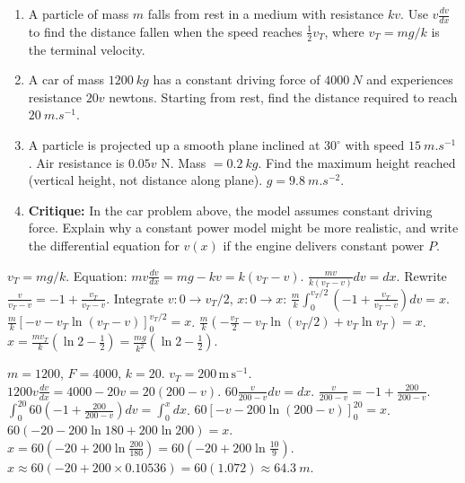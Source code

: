 \documentclass[11pt]{article}
\begin{document}
\begin{exercice}
\begin{enumerate}
\item A particle of mass $m$ falls from rest in a medium with resistance $kv$. Use $v\frac{dv}{dx}$ to find the distance fallen when the speed reaches $\frac{1}{2}v_T$, where $v_T=mg/k$ is the terminal velocity.
\item A car of mass $\SI{1200}{kg}$ has a constant driving force of $\SI{4000}{N}$ and experiences resistance $20v$ newtons. Starting from rest, find the distance required to reach $\SI{20}{m.s^{-1}}$.
\item A particle is projected up a smooth plane inclined at $30^\circ$ with speed $\SI{15}{m.s^{-1}}$. Air resistance is $0.05v$ N. Mass $=\SI{0.2}{kg}$. Find the maximum height reached (vertical height, not distance along plane). $g=\SI{9.8}{m.s^{-2}}$.
\item \textbf{Critique:} In the car problem above, the model assumes constant driving force. Explain why a constant power model might be more realistic, and write the differential equation for $v(x)$ if the engine delivers constant power $P$.
\end{enumerate}
\end{exercice}

\begin{corrige}[Exercise 1]
$v_T = mg/k$. Equation: $mv\frac{dv}{dx} = mg - kv = k(v_T - v)$.
$\frac{mv}{k(v_T-v)}dv = dx$. Rewrite $\frac{v}{v_T-v} = -1 + \frac{v_T}{v_T-v}$.
Integrate $v:0\to v_T/2$, $x:0\to x$:
$\frac{m}{k}\int_0^{v_T/2}(-1 + \frac{v_T}{v_T-v})dv = x$.
$\frac{m}{k}\left[ -v - v_T\ln(v_T-v) \right]_0^{v_T/2} = x$.
$\frac{m}{k}\left( -\frac{v_T}{2} - v_T\ln(v_T/2) + v_T\ln v_T \right) = x$.
$x = \frac{mv_T}{k}\left( \ln 2 - \frac{1}{2} \right) = \frac{mg}{k^2}\left( \ln 2 - \frac{1}{2} \right)$.
\end{corrige}

\begin{corrige}[Exercise 2]
$m=1200$, $F=4000$, $k=20$. $v_T = 200\,\mathrm{m\,s^{-1}}$.
$1200v\frac{dv}{dx} = 4000 - 20v = 20(200-v)$.
$60\frac{v}{200-v}dv = dx$. $\frac{v}{200-v} = -1 + \frac{200}{200-v}$.
$\int_0^{20} 60(-1 + \frac{200}{200-v})dv = \int_0^x dx$.
$60\left[ -v - 200\ln(200-v) \right]_0^{20} = x$.
$60\left( -20 - 200\ln180 + 200\ln200 \right) = x$.
$x = 60\left( -20 + 200\ln\frac{200}{180} \right) = 60\left( -20 + 200\ln\frac{10}{9} \right)$.
$x \approx 60(-20 + 200\times0.10536) = 60(1.072) \approx \SI{64.3}{m}$.
\end{corrige}
\end{document}
